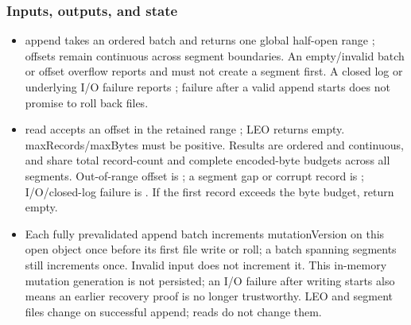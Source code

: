 \subsubsection*{Inputs, outputs, and state}
\begin{itemize}
\item append takes an ordered batch and returns one global half-open range \pathcode{[firstOffset,nextOffset)}; offsets remain continuous across segment boundaries. An empty/invalid batch or offset overflow reports  and must not create a segment first. A closed log or underlying I/O failure reports ; failure after a valid append starts does not promise to roll back files.
\item read accepts an offset in the retained range ; LEO returns empty. maxRecords/maxBytes must be positive. Results are ordered and continuous, and share total record-count and complete encoded-byte budgets across all segments. Out-of-range offset is ; a segment gap or corrupt record is ; I/O/closed-log failure is . If the first record exceeds the byte budget, return empty.
\item Each fully prevalidated append batch increments mutationVersion on this open object once before its first file write or roll; a batch spanning segments still increments once. Invalid input does not increment it. This in-memory mutation generation is not persisted; an I/O failure after writing starts also means an earlier recovery proof is no longer trustworthy. LEO and segment files change on successful append; reads do not change them.
\end{itemize}
